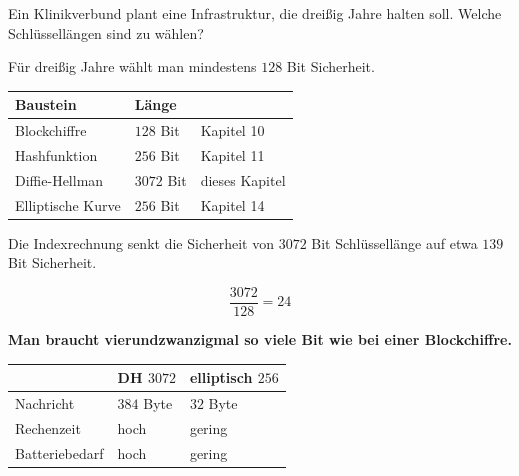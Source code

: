 \begin{aufgabe}
\begin{center}
\begin{minipage}{0.88\textwidth}
\end{minipage}
\end{center}
\end{aufgabe}

\begin{aufgabe}
Ein Klinikverbund plant eine Infrastruktur, die dreißig Jahre halten soll. Welche Schlüssellängen sind zu wählen?

\loesung
{}
Für dreißig Jahre wählt man mindestens $128$ Bit Sicherheit.

\begin{center}
{\small
\renewcommand{\arraystretch}{1.48}
\begin{tabular}{@{}P{2.8cm}P{2.2cm}P{2.6cm}@{}}
\toprule
\textbf{Baustein} & \textbf{Länge} & \\
\midrule
Blockchiffre & $128$ Bit & Kapitel 10\\
Hashfunktion & $256$ Bit & Kapitel 11\\
Diffie-Hellman & $3072$ Bit & \textcolor{akzent}{dieses Kapitel}\\
Elliptische Kurve & $256$ Bit & Kapitel 14\\
\bottomrule
\end{tabular}}
\end{center}

Die Indexrechnung senkt die Sicherheit von $3072$ Bit Schlüssellänge auf etwa $139$ Bit Sicherheit.

\[ \frac{3072}{128} = 24 \]

\begin{center}
\begin{minipage}{0.9\textwidth}
\textbf{Man braucht vierundzwanzigmal so viele Bit wie bei einer Blockchiffre.}
\end{minipage}
\end{center}

\begin{center}
{\small
\renewcommand{\arraystretch}{1.48}
\begin{tabular}{@{}P{2.4cm}P{2.2cm}P{2.6cm}@{}}
\toprule
& \textbf{DH $3072$} & \textbf{elliptisch $256$}\\
\midrule
Nachricht & $384$ Byte & $32$ Byte\\
Rechenzeit & hoch & \textcolor{gruen}{gering}\\
Batteriebedarf & hoch & \textcolor{gruen}{gering}\\
\bottomrule
\end{tabular}}
\end{center}


\end{aufgabe}
